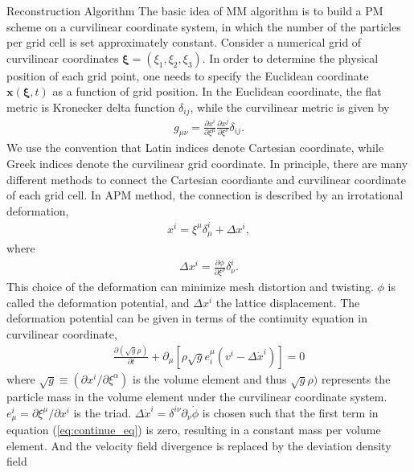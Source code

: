 \begin{section}{Reconstruction Algorithm}
  \label{sec:reconstruction}
   The basic idea of MM algorithm is to build a PM scheme on a curvilinear coordinate system, 
in which the number of the particles per grid cell is set approximately constant. 
    Consider a numerical grid of curvilinear coordinates 
$\bm{\xi}=\left(\xi_1,\xi_2,\xi_3\right)$. In order to determine the physical position 
of each grid point, one needs to specify the Euclidean coordinate $\bm{x}(\bm{\xi},t)$ 
as a function of grid position. In the Euclidean coordinate, the flat metric is Kronecker 
delta function $\delta_{ij}$, while the curvilinear metric is given by
\begin{align}
    g_{\mu\nu}=\frac{\partial x^i}{\partial \xi ^\mu} \frac{\partial x^j}{\partial \xi ^\nu}\delta_{ij}.
\end{align}
    We use the convention that Latin indices denote Cartesian coordinate, 
while Greek indices denote the curvilinear grid coordinate.
    In principle, there are many different methods to connect the Cartesian 
coordiante and curvilinear coordinate of each grid cell. In APM method, the 
connection is described by an irrotational deformation,
\begin{align}
    x^i=\xi ^\mu \delta ^i _\mu + \Delta x^i,
\end{align}
where
\begin{align}
 \label{eq:disp}
    \Delta x^i=\frac{\partial \phi}{\partial \xi ^ \nu}\delta ^i _\nu .
\end{align}
    This choice of the deformation can minimize mesh distortion and twisting. $\phi$ is called 
the deformation potential, and $\Delta x^i$ the lattice displacement. The deformation potential 
can be given in terms of the continuity equation in curvilinear coordinate,
\begin{align}
 \label{eq:continue_eq}
    \frac{\partial (\sqrt{g} \rho) }{\partial t}+\partial_\mu \left[\rho \sqrt{g} e^\mu _i \left(v^i - \Delta \dot{x}^i \right) \right] =0
\end{align}
where $\sqrt{g} \equiv (\partial x^i / \partial \xi ^ \alpha)$ is the volume element 
and thus $\sqrt{g} \rho)$ represents the particle mass in the volume element under the curvilinear 
coordinate system. $e^i _\mu = \partial \xi ^\mu / \partial x^i$ is the triad. 
$\Delta \dot{x}^i=\delta ^{i\nu}\partial _\nu \dot{\phi}$ is chosen such that the first 
term in equation (\ref{eq:continue_eq}) is zero, resulting in a constant mass per volume 
element. And the velocity field divergence is replaced by the deviation density field 

\end{section}
